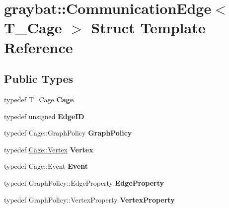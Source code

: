 \hypertarget{structgraybat_1_1CommunicationEdge}{}\section{graybat\+:\+:Communication\+Edge$<$ T\+\_\+\+Cage $>$ Struct Template Reference}
\label{structgraybat_1_1CommunicationEdge}
\subsection*{Public Types}
\begin{DoxyCompactItemize}
\item 
\hypertarget{structgraybat_1_1CommunicationEdge_a013276d41805d452b7ec3f32c5d98863}{}typedef T\+\_\+\+Cage {\bfseries Cage}\label{structgraybat_1_1CommunicationEdge_a013276d41805d452b7ec3f32c5d98863}

\item 
\hypertarget{structgraybat_1_1CommunicationEdge_af7b14d3933ec26615c4e849f32d9cbc7}{}typedef unsigned {\bfseries Edge\+I\+D}\label{structgraybat_1_1CommunicationEdge_af7b14d3933ec26615c4e849f32d9cbc7}

\item 
\hypertarget{structgraybat_1_1CommunicationEdge_a1fd741b205ef5042c9ce064419862ab8}{}typedef Cage\+::\+Graph\+Policy {\bfseries Graph\+Policy}\label{structgraybat_1_1CommunicationEdge_a1fd741b205ef5042c9ce064419862ab8}

\item 
\hypertarget{structgraybat_1_1CommunicationEdge_ad867b26007833b4de0d5b4b9ee5b7d57}{}typedef \hyperlink{structgraybat_1_1CommunicationVertex}{Cage\+::\+Vertex} {\bfseries Vertex}\label{structgraybat_1_1CommunicationEdge_ad867b26007833b4de0d5b4b9ee5b7d57}

\item 
\hypertarget{structgraybat_1_1CommunicationEdge_a30c072501669f1f1709045822bab3383}{}typedef Cage\+::\+Event {\bfseries Event}\label{structgraybat_1_1CommunicationEdge_a30c072501669f1f1709045822bab3383}

\item 
\hypertarget{structgraybat_1_1CommunicationEdge_a5fe445399b0bea6653fe27eb8d5617b6}{}typedef Graph\+Policy\+::\+Edge\+Property {\bfseries Edge\+Property}\label{structgraybat_1_1CommunicationEdge_a5fe445399b0bea6653fe27eb8d5617b6}

\item 
\hypertarget{structgraybat_1_1CommunicationEdge_a1ffdda19998f083210324c321b4599dc}{}typedef Graph\+Policy\+::\+Vertex\+Property {\bfseries Vertex\+Property}\label{structgraybat_1_1CommunicationEdge_a1ffdda19998f083210324c321b4599dc}

\end{DoxyCompactItemize}
